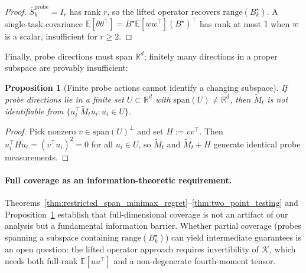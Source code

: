 \documentclass[11pt]{article}
\newcommand{\R}{\mathbb{R}}
\newcommand{\E}{\mathbb{E}}
\newcommand{\range}{\mathrm{range}}
\newcommand{\Span}{\mathrm{span}}
\newtheorem{proposition}{Proposition}
\begin{document}
\begin{proof}
$\bar{S}_k^{\mathrm{probe}}=I_r$ has rank $r$, so the lifted operator recovers
$\range(B_k^\star)$.
A single-task covariance $\E[\theta\theta^\top]=B^\star\E[ww^\top](B^\star)^\top$
has rank at most $1$ when $w$ is a scalar, insufficient for $r\ge 2$.
\end{proof}

\noindent Finally, probe directions must span $\R^d$; finitely many directions
in a proper subspace are provably insufficient:

\begin{proposition}[Finite probe actions cannot identify a changing subspace]
\label{prop:separation_elu}
If probe directions lie in a finite set $U\subset\R^d$ with $\Span(U)\neq\R^d$,
then $\widetilde{M}_t$ is not identifiable from
$\{u_i^\top\widetilde{M}_t u_i:u_i\in U\}$.
\end{proposition}

\begin{proof}
Pick nonzero $v\in\Span(U)^\perp$ and set $H:=vv^\top$.
Then $u_i^\top Hu_i=(v^\top u_i)^2=0$ for all $u_i\in U$, so $\widetilde{M}_t$
and $\widetilde{M}_t+H$ generate identical probe measurements.
\end{proof}

\paragraph{Full coverage as an information-theoretic requirement.}
Theorems~\ref{thm:restricted_span_minimax_regret}--\ref{thm:two_point_testing}
and Proposition~\ref{prop:separation_elu} establish that full-dimensional coverage
is not an artifact of our analysis but a fundamental information barrier.
Whether partial coverage (probes spanning a subspace containing $\range(B_k^\star)$)
can yield intermediate guarantees is an open question: the lifted operator approach
requires invertibility of $\mathcal{K}$, which needs both full-rank $\E[uu^\top]$ and
a non-degenerate fourth-moment tensor.
\end{document}
